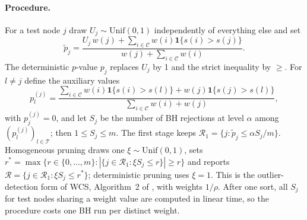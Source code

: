\documentclass[twoside]{article}
\newcommand{\ind}{\mathbf{1}}
\newcommand{\calset}{\mathcal{C}}
\newcommand{\testset}{\mathcal{T}}
\begin{document}
\paragraph{Procedure.}
For a test node $j$ draw $U_j\sim\mathrm{Unif}(0,1)$ independently of everything else and set
\begin{equation}
\tilde p_j=\frac{U_j\,w(j)+\sum_{i\in\calset}w(i)\ind\{s(i)>s(j)\}}{w(j)+\sum_{i\in\calset}w(i)}.
\label{eq:randp}
\end{equation}
The deterministic $p$-value $p_j$ replaces $U_j$ by 1 and the strict inequality by $\ge$. For $l\neq j$ define the auxiliary values
\begin{equation}
p_l^{(j)}=\frac{\sum_{i\in\calset}w(i)\ind\{s(i)>s(l)\}+w(j)\ind\{s(j)>s(l)\}}{\sum_{i\in\calset}w(i)+w(j)},
\label{eq:aux}
\end{equation}
with $p_j^{(j)}=0$, and let $S_j$ be the number of BH rejections at level $\alpha$ among $(p_l^{(j)})_{l\in\testset}$; then $1\le S_j\le m$. The first stage keeps $\mathcal R_1=\{j:\tilde p_j\le\alpha S_j/m\}$. Homogeneous pruning draws one $\xi\sim\mathrm{Unif}(0,1)$, sets $r^*=\max\{r\in\{0,\ldots,m\}:|\{j\in\mathcal R_1:\xi S_j\le r\}|\ge r\}$ and reports $\mathcal R=\{j\in\mathcal R_1:\xi S_j\le r^*\}$; deterministic pruning uses $\xi=1$. This is the outlier-detection form of WCS, Algorithm~2 of \citet{jin2023algorithm}, with weights $1/\rho$. After one sort, all $S_j$ for test nodes sharing a weight value are computed in linear time, so the procedure costs one BH run per distinct weight.
\end{document}
